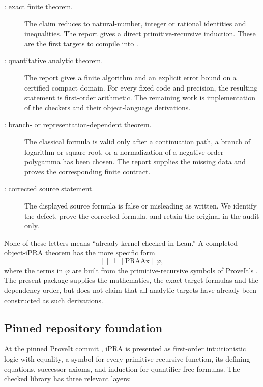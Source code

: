 \begin{description}
\item[\statusA: exact finite theorem.]  The claim reduces to natural-number,
integer or rational identities and inequalities.  The report gives a direct
primitive-recursive induction.  These are the first targets to compile into
.

\item[\statusB: quantitative analytic theorem.]  The report gives a finite
algorithm and an explicit error bound on a certified compact domain.  For every
fixed code and precision, the resulting statement is first-order arithmetic.
The remaining work is implementation of the checkers and their object-language
derivations.

\item[\statusC: branch- or representation-dependent theorem.]  The classical
formula is valid only after a continuation path, a branch of logarithm or
square root, or a normalization of a negative-order polygamma has been chosen.
The report supplies the missing data and proves the corresponding finite
contract.

\item[\statusD: corrected source statement.]  The displayed source formula is
false or misleading as written.  We identify the defect, prove the corrected
formula, and retain the original in the audit only.
\end{description}

None of these letters means ``already kernel-checked in Lean.''  A completed
object-iPRA theorem has the more specific form
\[
  []\;\vdash[\mathrm{PRAAx}]\;\varphi,
\]
where the terms in \(\varphi\) are built from the primitive-recursive symbols of
ProveIt's .  The present package supplies the mathematics,
the exact target formulas and the dependency order, but does not claim that all
analytic targets have already been constructed as such derivations.

\subsection{Pinned repository foundation}

At the pinned ProveIt commit \cite{ProveIt}, iPRA is presented as first-order
intuitionistic logic with equality, a symbol for every primitive-recursive
function, its defining equations, successor axioms, and induction for
quantifier-free formulas.  The checked library has three relevant layers:

